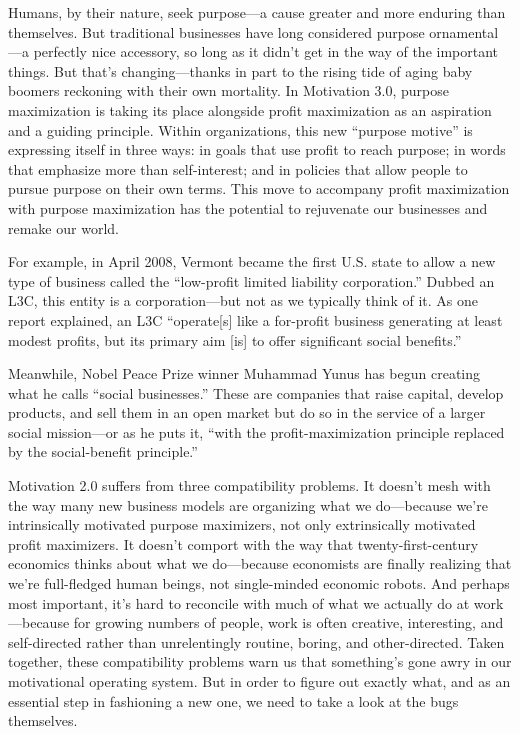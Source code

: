 Humans, by their nature, seek purpose—a cause greater and more enduring than themselves. But traditional businesses have long considered purpose ornamental—a perfectly nice accessory, so long as it didn’t get in the way of the important things. But that’s changing—thanks in part to the rising tide of aging baby boomers reckoning with their own mortality. In Motivation 3.0, purpose maximization is taking its place alongside profit maximization as an aspiration and a guiding principle. Within organizations, this new “purpose motive” is expressing itself in three ways: in goals that use profit to reach purpose; in words that emphasize more than self-interest; and in policies that allow people to pursue purpose on their own terms. This move to accompany profit maximization with purpose maximization has the potential to rejuvenate our businesses and remake our world.

For example, in April 2008, Vermont became the first U.S. state to allow a new type of business called the “low-profit limited liability corporation.” Dubbed an L3C, this entity is a corporation—but not as we typically think of it. As one report explained, an L3C “operate[s] like a for-profit business generating at least modest profits, but its primary aim [is] to offer significant social benefits.”

Meanwhile, Nobel Peace Prize winner Muhammad Yunus has begun creating what he calls “social businesses.” These are companies that raise capital, develop products, and sell them in an open market but do so in the service of a larger social mission—or as he puts it, “with the profit-maximization principle replaced by the social-benefit principle.”


Motivation 2.0 suffers from three compatibility problems. It doesn’t mesh with the way many new business models are organizing what we do—because we’re intrinsically motivated purpose maximizers, not only extrinsically motivated profit maximizers. It doesn’t comport with the way that twenty-first-century economics thinks about what we do—because economists are finally realizing that we’re full-fledged human beings, not single-minded economic robots. And perhaps most important, it’s hard to reconcile with much of what we actually do at work—because for growing numbers of people, work is often creative, interesting, and self-directed rather than unrelentingly routine, boring, and other-directed. Taken together, these compatibility problems warn us that something’s gone awry in our motivational operating system.
But in order to figure out exactly what, and as an essential step in fashioning a new one, we need to take a look at the bugs themselves.

